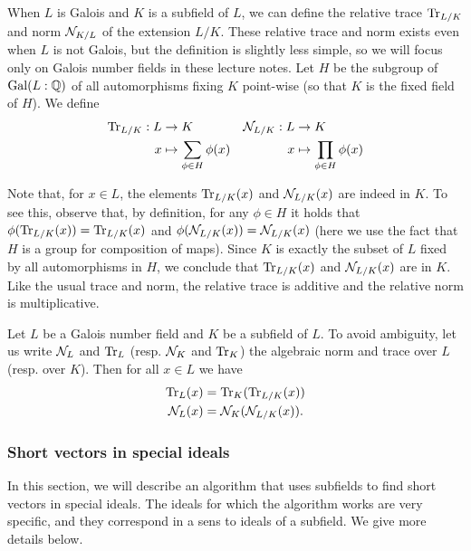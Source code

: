 When $L$ is Galois and $K$ is a subfield of $L$, we can define the relative trace $\mathrm{Tr}_{L/K}$ and norm $\mathcal{N}_{K/L}$ of the extension $L/K$. These relative trace and norm exists even when $L$ is not Galois, but the definition is slightly less simple, so we will focus only on Galois number fields in these lecture notes. Let $H$ be the subgroup of $\operatorname{Gal}(L:\mathbb{Q})$ of all automorphisms fixing $K$ point-wise (so that $K$ is the fixed field of $H$). We define
\begin{align*}
\mathrm{Tr}_{L/K}: L &\rightarrow K  & \mathcal{N}_{L/K}: L &\rightarrow K\\
x &\mapsto \sum_{\phi \in H} \phi(x)  & x &\mapsto \prod_{\phi \in H} \phi(x)\\
\end{align*}

Note that, for $x \in L$, the elements $\mathrm{Tr}_{L/K}(x)$ and $\mathcal{N}_{L/K}(x)$ are indeed in $K$. To see this, observe that, by definition, for any $\phi \in H$ it holds that $\phi(\mathrm{Tr}_{L/K}(x)) = \mathrm{Tr}_{L/K}(x)$ and $\phi(\mathcal{N}_{L/K}(x)) = \mathcal{N}_{L/K}(x)$ (here we use the fact that $H$ is a group for composition of maps). Since $K$ is exactly the subset of $L$ fixed by all automorphisms in $H$, we conclude that $\mathrm{Tr}_{L/K}(x)$ and $\mathcal{N}_{L/K}(x)$ are in $K$. Like the usual trace and norm, the relative trace is additive and the relative norm is multiplicative.

\begin{lemma}
Let $L$ be a Galois number field and $K$ be a subfield of $L$. To avoid ambiguity, let us write $\mathcal{N}_L$ and $\mathrm{Tr}_L$ (resp. $\mathcal{N}_K$ and $\mathrm{Tr}_K$) the algebraic norm and trace over $L$ (resp. over $K$). Then for all $x \in L$ we have
\begin{align}
\label{eq:composing-relative-norm} \mathrm{Tr}_L(x) &= \mathrm{Tr}_K(\mathrm{Tr}_{L/K}(x)) \\
\mathcal{N}_L(x) &= \mathcal{N}_K(\mathcal{N}_{L/K}(x)).
\end{align}
\end{lemma}

\subsubsection{Short vectors in special ideals}

In this section, we will describe an algorithm that uses subfields to find short vectors in special ideals. The ideals for which the algorithm works are very specific, and they correspond in a sens to ideals of a subfield. We give more details below.

